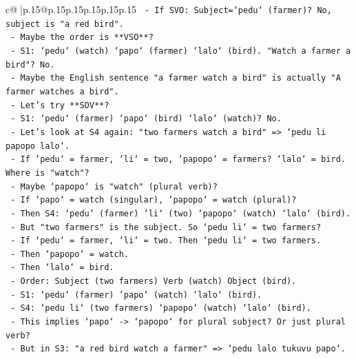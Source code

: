 \documentclass{article}
\begin{document}
{\begin{supertabular}{c@{$\;$}|p{.15\linewidth}@{}p{.15\linewidth}p{.15\linewidth}p{.15\linewidth}p{.15\linewidth}p{.15\linewidth}}
{{{\texttt{                 {-} If SVO: Subject=`pedu` (farmer)? No, subject is "a red bird".} \\
\texttt{                 {-} Maybe the order is **VSO**?} \\
\texttt{                   {-} S1: `pedu` (watch) `papo` (farmer) `lalo` (bird). "Watch a farmer a bird"? No.} \\
\texttt{                   {-} Maybe the English sentence "a farmer watch a bird" is actually "A farmer watches a bird".} \\
\texttt{                   {-} Let's try **SOV**?} \\
\texttt{                     {-} S1: `pedu` (farmer) `papo` (bird) `lalo` (watch)? No.} \\
\texttt{               {-} Let's look at S4 again: "two farmers watch a bird" => `pedu li papopo lalo`.} \\
\texttt{                 {-} If `pedu` = farmer, `li` = two, `papopo` = farmers? `lalo` = bird. Where is "watch"?} \\
\texttt{                 {-} Maybe `papopo` is "watch" (plural verb)?} \\
\texttt{                 {-} If `papo` = watch (singular), `papopo` = watch (plural)?} \\
\texttt{                 {-} Then S4: `pedu` (farmer) `li` (two) `papopo` (watch) `lalo` (bird).} \\
\texttt{                 {-} But "two farmers" is the subject. So `pedu li` = two farmers?} \\
\texttt{                 {-} If `pedu` = farmer, `li` = two. Then `pedu li` = two farmers.} \\
\texttt{                 {-} Then `papopo` = watch.} \\
\texttt{                 {-} Then `lalo` = bird.} \\
\texttt{                 {-} Order: Subject (two farmers) Verb (watch) Object (bird).} \\
\texttt{                 {-} S1: `pedu` (farmer) `papo` (watch) `lalo` (bird).} \\
\texttt{                 {-} S4: `pedu li` (two farmers) `papopo` (watch) `lalo` (bird).} \\
\texttt{                 {-} This implies `papo` {-}> `papopo` for plural subject? Or just plural verb?} \\
\texttt{                 {-} But in S3: "a red bird watch a farmer" => `pedu lalo tukuvu papo`.} \\
}}}
\end{supertabular}}
\end{document}

